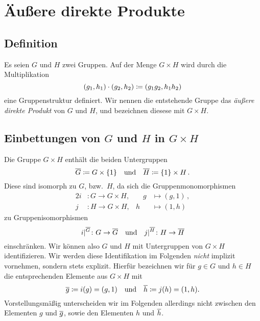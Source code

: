 \section{Äußere direkte Produkte}





\subsection*{Definition}

Es seien $G$ und $H$ zwei Gruppen.
Auf der Menge $G \times H$ wird durch die Multiplikation
\[
          (g_1, h_1) \cdot (g_2, h_2)
  \coloneqq (g_1 g_2, h_1 h_2)
\]
eine Gruppenstruktur definiert.
Wir nennen die entstehende Gruppe das \emph{äußere direkte Produkt} von $G$ und $H$, und bezeichnen diesese mit $G \times H$.





\subsection*{Einbettungen von \texorpdfstring{$G$}{G} und \texorpdfstring{$H$}{H} in \texorpdfstring{$G \times H$}{G x H}}

Die Gruppe $G \times H$ enthält die beiden Untergruppen
\[
          \overline{G}
  \coloneqq G \times \{1\}
  \quad\text{und}\quad
          \overline{H}
  \coloneqq \{1\} \times H \,.
\]
Diese sind isomorph zu $G$, bzw.\ $H$, da sich die Gruppenmonomorphismen
\begin{alignat*}{2}
            i
  &\colon   G
   \to      G \times H,
   &
   \quad    g
  &\mapsto  (g,1) \,,
  \\
            j
  &\colon   H
   \to      G \times H,
   &
            h
  &\mapsto (1,h)
\end{alignat*}
zu Gruppenisomorphismen
\[
        \restrict{i}{}[\induced{G}]
 \colon G
 \to    \induced{G}
 \quad\text{und}\quad
        \restrict{j}{}[\induced{H}]
 \colon H
 \to    \induced{H}
\]
einschränken.
Wir können also $G$ und $H$ mit Untergruppen von $G \times H$ identifizieren.
Wir werden diese Identifikation im Folgenden \emph{nicht} implizit vornehmen, sondern stets explizit.
Hierfür bezeichnen wir für $g \in G$ und $h \in H$ die entsprechenden Elemente aus $G \times H$ mit
\[
          \overline{g}
  \coloneqq i(g)
  =       (g,1)
  \quad\text{und}\quad
          \overline{h}
  \coloneqq j(h)
  =       (1,h).
\]
Vorstellungsmäßig unterscheiden wir im Folgenden allerdings nicht zwischen den Elementen $g$ und $\overline{g}$, sowie den Elementen $h$ und $\overline{h}$.





